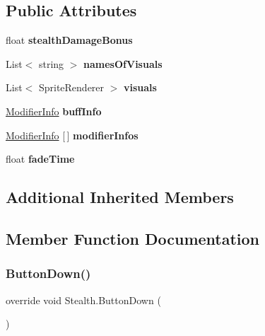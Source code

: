 \subsection*{Public Attributes}
\begin{DoxyCompactItemize}
\item 
\hypertarget{class_stealth_a147d8f8844df5085437643a87ae048ff}{}\label{class_stealth_a147d8f8844df5085437643a87ae048ff} 
float {\bfseries stealth\+Damage\+Bonus}
\item 
\hypertarget{class_stealth_a7f44ee9e0cba7f514c160f258168012e}{}\label{class_stealth_a7f44ee9e0cba7f514c160f258168012e} 
List$<$ string $>$ {\bfseries names\+Of\+Visuals}
\item 
\hypertarget{class_stealth_aa5f7d01028a63e6820d520e231beed09}{}\label{class_stealth_aa5f7d01028a63e6820d520e231beed09} 
List$<$ Sprite\+Renderer $>$ {\bfseries visuals}
\item 
\hypertarget{class_stealth_af1149956df5ee6e656393db80cce39a1}{}\label{class_stealth_af1149956df5ee6e656393db80cce39a1} 
\hyperlink{struct_modifier_info}{Modifier\+Info} {\bfseries buff\+Info}
\item 
\hypertarget{class_stealth_a9ca03d60a4f9bb2ff4b12d4b3ef7e2ce}{}\label{class_stealth_a9ca03d60a4f9bb2ff4b12d4b3ef7e2ce} 
\hyperlink{struct_modifier_info}{Modifier\+Info} \mbox{[}$\,$\mbox{]} {\bfseries modifier\+Infos}
\item 
\hypertarget{class_stealth_a3d34c61bc304be9212b0544e1e30de06}{}\label{class_stealth_a3d34c61bc304be9212b0544e1e30de06} 
float {\bfseries fade\+Time}
\end{DoxyCompactItemize}
\subsection*{Additional Inherited Members}


\subsection{Member Function Documentation}
\hypertarget{class_stealth_aae7d450018e62c03c909694ceef22511}{}\label{class_stealth_aae7d450018e62c03c909694ceef22511} 
\subsubsection{\texorpdfstring{Button\+Down()}{ButtonDown()}}
{\footnotesize\ttfamily override void Stealth.\+Button\+Down (\begin{DoxyParamCaption}{ }\end{DoxyParamCaption})\hspace{0.3cm}{\ttfamily [virtual]}}



